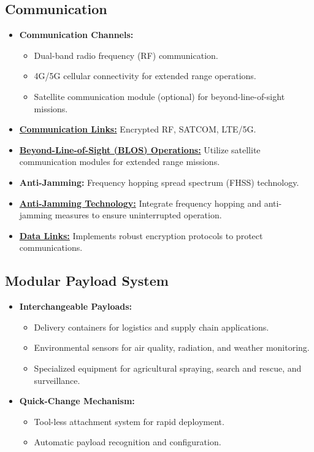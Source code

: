 \documentclass{article}
\begin{document}
\subsection{Communication}
\begin{itemize}
    \item \textbf{Communication Channels:}
    \begin{itemize}
        \item Dual-band radio frequency (RF) communication.
        \item 4G/5G cellular connectivity for extended range operations.
        \item Satellite communication module (optional) for beyond-line-of-sight missions.
    \end{itemize}
    \item \textbf{\underline{Communication Links:}} Encrypted RF, SATCOM, LTE/5G.
    \item \textbf{\underline{Beyond-Line-of-Sight (BLOS) Operations:}} Utilize satellite communication modules for extended range missions.
    \item \textbf{Anti-Jamming:} Frequency hopping spread spectrum (FHSS) technology.
    \item \textbf{\underline{Anti-Jamming Technology:}} Integrate frequency hopping and anti-jamming measures to ensure uninterrupted operation.
    \item \textbf{\underline{Data Links:}} Implements robust encryption protocols to protect communications.
\end{itemize}

\subsection{Modular Payload System}
\begin{itemize}
    \item \textbf{Interchangeable Payloads:}
    \begin{itemize}
        \item Delivery containers for logistics and supply chain applications.
        \item Environmental sensors for air quality, radiation, and weather monitoring.
        \item Specialized equipment for agricultural spraying, search and rescue, and surveillance.
    \end{itemize}
    \item \textbf{Quick-Change Mechanism:}
    \begin{itemize}
        \item Tool-less attachment system for rapid deployment.
        \item Automatic payload recognition and configuration.
    \end{itemize}
\end{itemize}
\end{document}
